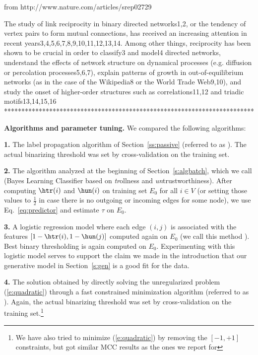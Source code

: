 from http://www.nature.com/articles/srep02729

The study of link reciprocity in binary directed networks1,2, or the tendency
of vertex pairs to form mutual connections, has received an increasing
attention in recent years3,4,5,6,7,8,9,10,11,12,13,14. Among other things,
reciprocity has been shown to be crucial in order to classify3 and model4
directed networks, understand the effects of network structure on dynamical
processes (e.g. diffusion or percolation processes5,6,7), explain patterns of
growth in out-of-equilibrium networks (as in the case of the Wikipedia8 or the
World Trade Web9,10), and study the onset of higher-order structures such as
correlations11,12 and triadic motifs13,14,15,16
************************************************************************
\fi

{\bf Algorithms and parameter tuning.} 
We compared the following algorithms:
%
%

{\bf 1.} The label propagation algorithm of Section~\ref{ss:passive} (referred to as \uslpropGsec{}). The actual binarizing threshold was set by cross-validation on the training set.
%

{\bf 2.} The algorithm analyzed at the beginning of Section~\ref{s:algbatch}, which we call \usrule{} (Bayes Learning Classifier based on {\em tr}ollness and {\em un}trustworthiness). After computing $\htr(i)$ and $\hun(i)$ on training set $E_0$ for all $i \in V$ (or setting those values to $\frac{1}{2}$ in case there is no outgoing or incoming edges for some node), we use Eq.~\eqref{eq:predictor} and estimate $\tau$ on $E_0$.
%

{\bf 3.} A logistic regression model where each edge $(i,j)$ is associated with the features $[1-\htr(i), 1-\hun(j)]$ computed again on $E_0$ (we call this method \uslogregp{}). Best binary thresholding is again computed on $E_0$. Experimenting with this logistic model serves to support the claim we made in the introduction that our generative model in Section~\ref{s:gen} is a good fit for the data.

%
{\bf 4.} The solution obtained by directly solving the unregularized problem (\ref{e:quadratic}) through a fast constrained minimization algorithm (referred to as \qoptim{}). Again, the actual binarizing threshold was set by cross-validation on the training set.\footnote
{
We have also tried to minimize (\ref{e:quadratic}) by removing the $[-1,+1]$ constraints, but got similar MCC results
as the ones we report for \qoptim{}
}
%

